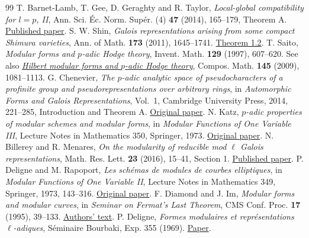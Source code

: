 \documentclass[a4paper,11pt]{article}
\theoremstyle{definition}
\theoremstyle{remark}
\numberwithin{equation}{section}
\begin{document}
\begin{thebibliography}{99}
 T. Barnet-Lamb, T. Gee, D. Geraghty and R. Taylor, \emph{Local-global compatibility for \(l=p\), II}, Ann. Sci. \'Ec. Norm. Sup\'er. (4) \textbf{47} (2014), 165--179, Theorem A. \href{https://www.numdam.org/articles/10.24033/asens.2212/}{Published paper}.
 S. W. Shin, \emph{Galois representations arising from some compact Shimura varieties}, Ann. of Math. \textbf{173} (2011), 1645--1741. \href{https://annals.math.princeton.edu/2011/173-3/p09}{Theorem 1.2}.
 T. Saito, \emph{Modular forms and \(p\)-adic Hodge theory}, Invent. Math. \textbf{129} (1997), 607--620. See also \href{https://www.ms.u-tokyo.ac.jp/~t-saito/pp/h.pdf}{\emph{Hilbert modular forms and \(p\)-adic Hodge theory}}, Compos. Math. \textbf{145} (2009), 1081--1113.
 G. Chenevier, \emph{The \(p\)-adic analytic space of pseudocharacters of a profinite group and pseudorepresentations over arbitrary rings}, in \emph{Automorphic Forms and Galois Representations}, Vol.~1, Cambridge University Press, 2014, 221--285, Introduction and Theorem A. \href{https://gaetan.chenevier.perso.math.cnrs.fr/articles/determinants.pdf}{Original paper}.
 N. Katz, \emph{\(p\)-adic properties of modular schemes and modular forms}, in \emph{Modular Functions of One Variable III}, Lecture Notes in Mathematics 350, Springer, 1973. \href{https://web.math.princeton.edu/~nmk/old/padicpropMFMS.pdf}{Original paper}.
 N. Billerey and R. Menares, \emph{On the modularity of reducible mod \(\ell\) Galois representations}, Math. Res. Lett. \textbf{23} (2016), 15--41, Section 1. \href{https://lmbp.uca.fr/~billerey/Research/Published/Menares_Modularity.pdf}{Published paper}.
 P. Deligne and M. Rapoport, \emph{Les sch\'emas de modules de courbes elliptiques}, in \emph{Modular Functions of One Variable II}, Lecture Notes in Mathematics 349, Springer, 1973, 143--316. \href{https://publications.ias.edu/book/export/html/367}{Original paper}.
 F. Diamond and J. Im, \emph{Modular forms and modular curves}, in \emph{Seminar on Fermat's Last Theorem}, CMS Conf. Proc. \textbf{17} (1995), 39--133. \href{https://wstein.org/edu/Fall2003/252/references/diamond-im/Diamond-Im-Modular_forms_and_modular_curves.pdf}{Authors' text}.
 P. Deligne, \emph{Formes modulaires et repr\'esentations \(\ell\)-adiques}, S\'eminaire Bourbaki, Exp. 355 (1969). \href{https://www.numdam.org/item/SB_1968-1969__11__139_0.pdf}{Paper}.

\end{thebibliography}
\end{document}

